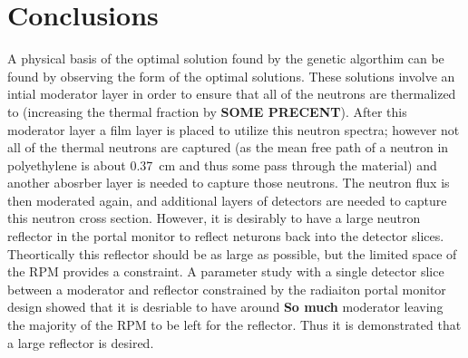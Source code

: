 \section{Conclusions}

A physical basis of the optimal solution found by the genetic algorthim can be found by observing the form of the optimal solutions.
These solutions involve an intial moderator layer in order to ensure that all of the neutrons are thermalized to (increasing the thermal fraction by \textbf{SOME PRECENT}).
After this moderator layer a film layer is placed to utilize this neutron spectra; however not all of the thermal neutrons are captured (as the mean free path of a neutron in polyethylene is about \SI{0.37}{\cm} and thus some pass through the material) and another abosrber layer is needed to capture those neutrons.  
The neutron flux is then moderated again, and additional layers of detectors are needed to capture this neutron cross section.
However, it is desirably to have a large neutron reflector in the portal monitor to reflect neturons back into the detector slices. 
Theortically this reflector should be as large as possible, but the limited space of the RPM provides a constraint.
A parameter study with a single detector slice between a moderator and reflector constrained by the radiaiton portal monitor design showed that it is desriable to have around \textbf{So much} moderator leaving the majority of the RPM to be left for the reflector.
Thus it is demonstrated that a large reflector is desired.
